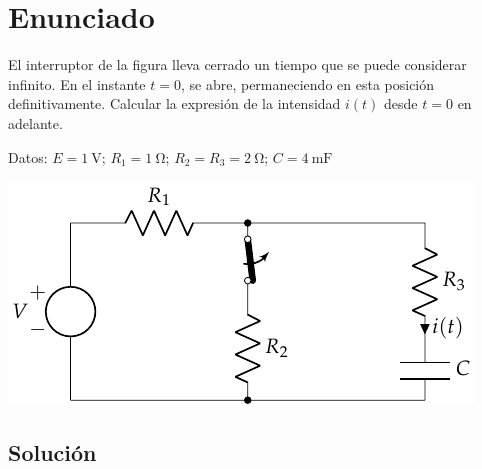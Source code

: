 \section{Enunciado}
El interruptor de la figura lleva cerrado un tiempo que se puede
  considerar infinito. En el instante $t=0$, se abre, permaneciendo en
  esta posición definitivamente. Calcular la expresión de la
  intensidad $i(t)$ desde $t=0$ en adelante.  
  
  Datos:\;
  $E = \qty{1}{\volt}$;\; $R_1 = \qty{1}{\ohm}$;\;
  $R_2 = R_3 = \qty{2}{\ohm}$;\; $C = \qty{4}{\milli\farad}$

\begin{center}
  \includegraphics{figuras/BT4_01.pdf}
\end{center}

\subsection*{Solución}

